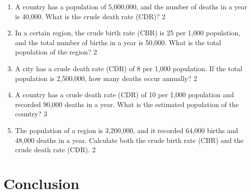 \documentclass[a4paper,oneside, margin=1.4in]{book}
\begin{document}
\begin{enumerate}
 \item A country has a population of 5,000,000, and the number of deaths in a year is 40,000. What is the crude death rate (CDR)? \hfill 2  

\item In a certain region, the crude birth rate (CBR) is 25 per 1,000 population, and the total number of births in a year is 50,000. What is the total population of the region? \hfill 2

\item A city has a crude death rate (CDR) of 8 per 1,000 population. If the total population is 2,500,000, how many deaths occur annually? \hfill 2  

\item A country has a crude death rate (CDR) of 10 per 1,000 population and recorded 90,000 deaths in a year. What is the estimated population of the country? \hfill 3  

\item The population of a region is 3,200,000, and it recorded 64,000 births and 48,000 deaths in a year. Calculate both the crude birth rate (CBR) and the crude death rate (CDR). \hfill 2


  
    \end{enumerate}

\backmatter
\chapter{Conclusion}
\lipsum[8]

\tableofcontents
\end{document}
